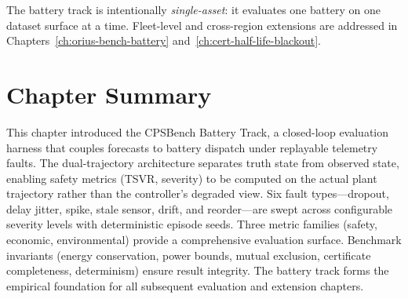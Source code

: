 The battery track is intentionally \emph{single-asset}: it evaluates one
battery on one dataset surface at a time.  Fleet-level and cross-region
extensions are addressed in Chapters~\ref{ch:orius-bench-battery}
and~\ref{ch:cert-half-life-blackout}.

\section{Chapter Summary}

This chapter introduced the CPSBench Battery Track, a closed-loop
evaluation harness that couples forecasts to battery dispatch under
replayable telemetry faults.  The dual-trajectory architecture separates
truth state from observed state, enabling safety metrics (TSVR, severity)
to be computed on the actual plant trajectory rather than the controller's
degraded view.  Six fault types---dropout, delay jitter, spike, stale
sensor, drift, and reorder---are swept across configurable severity levels
with deterministic episode seeds.  Three metric families (safety, economic,
environmental) provide a comprehensive evaluation surface.  Benchmark
invariants (energy conservation, power bounds, mutual exclusion, certificate
completeness, determinism) ensure result integrity.  The battery track
forms the empirical foundation for all subsequent evaluation and extension
chapters.
